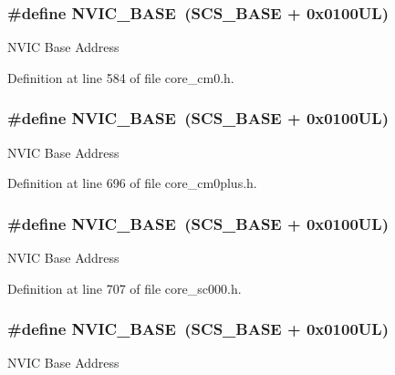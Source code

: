 \subsubsection[{\texorpdfstring{N\+V\+I\+C\+\_\+\+B\+A\+SE}{NVIC_BASE}}]{\setlength{\rightskip}{0pt plus 5cm}\#define N\+V\+I\+C\+\_\+\+B\+A\+SE~({\bf S\+C\+S\+\_\+\+B\+A\+SE} +  0x0100\+U\+L)}\hypertarget{group___c_m_s_i_s__core__base_gaa0288691785a5f868238e0468b39523d}{}\label{group___c_m_s_i_s__core__base_gaa0288691785a5f868238e0468b39523d}
N\+V\+IC Base Address 

Definition at line 584 of file core\+\_\+cm0.\+h.

\subsubsection[{\texorpdfstring{N\+V\+I\+C\+\_\+\+B\+A\+SE}{NVIC_BASE}}]{\setlength{\rightskip}{0pt plus 5cm}\#define N\+V\+I\+C\+\_\+\+B\+A\+SE~({\bf S\+C\+S\+\_\+\+B\+A\+SE} +  0x0100\+U\+L)}\hypertarget{group___c_m_s_i_s__core__base_gaa0288691785a5f868238e0468b39523d}{}\label{group___c_m_s_i_s__core__base_gaa0288691785a5f868238e0468b39523d}
N\+V\+IC Base Address 

Definition at line 696 of file core\+\_\+cm0plus.\+h.

\subsubsection[{\texorpdfstring{N\+V\+I\+C\+\_\+\+B\+A\+SE}{NVIC_BASE}}]{\setlength{\rightskip}{0pt plus 5cm}\#define N\+V\+I\+C\+\_\+\+B\+A\+SE~({\bf S\+C\+S\+\_\+\+B\+A\+SE} +  0x0100\+U\+L)}\hypertarget{group___c_m_s_i_s__core__base_gaa0288691785a5f868238e0468b39523d}{}\label{group___c_m_s_i_s__core__base_gaa0288691785a5f868238e0468b39523d}
N\+V\+IC Base Address 

Definition at line 707 of file core\+\_\+sc000.\+h.

\subsubsection[{\texorpdfstring{N\+V\+I\+C\+\_\+\+B\+A\+SE}{NVIC_BASE}}]{\setlength{\rightskip}{0pt plus 5cm}\#define N\+V\+I\+C\+\_\+\+B\+A\+SE~({\bf S\+C\+S\+\_\+\+B\+A\+SE} +  0x0100\+U\+L)}\hypertarget{group___c_m_s_i_s__core__base_gaa0288691785a5f868238e0468b39523d}{}\label{group___c_m_s_i_s__core__base_gaa0288691785a5f868238e0468b39523d}
N\+V\+IC Base Address 

